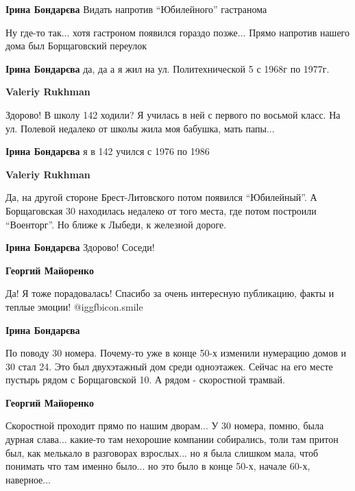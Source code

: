 \begin{itemize} %
\textbf{Ірина Бондарєва} Видать напротив \enquote{Юбилейного} гастранома

\begin{itemize} %
Ну где-то так... хотя гастроном появился гораздо позже...
Прямо напротив нашего дома был Борщаговский переулок

\textbf{Ірина Бондарєва} да, да а я жил на ул. Политехнической 5 с 1968г по 1977г.

\textbf{Valeriy Rukhman} 

Здорово! В школу 142 ходили? Я училась в ней с первого по восьмой класс. На
ул. Полевой недалеко от школы жила моя бабушка, мать папы...

\textbf{Ірина Бондарєва} я в 142 учился с 1976 по 1986

\textbf{Valeriy Rukhman} 

Да, на другой стороне Брест-Литовского потом появился \enquote{Юбилейный}. А
Борщаговская 30 находилась недалеко от того места, где потом построили
\enquote{Военторг}. Но ближе к Лыбеди, к железной дороге.

\end{itemize} %

\textbf{Ірина Бондарєва} Здорово! Соседи!

\begin{itemize} %
\textbf{Георгий Майоренко} 

Да! Я тоже порадовалась! Спасибо за очень интересную публикацию, факты и теплые эмоции! @igg{fbicon.smile} 

\textbf{Ірина Бондарєва} 

По поводу 30 номера. Почему-то уже в конце 50-х изменили нумерацию домов и 30
стал 24. Это был двухэтажный дом среди одноэтажек. Сейчас на его месте пустырь
рядом с Борщаговской 10. А рядом - скоростной трамвай.

\textbf{Георгий Майоренко} 

Скоростной проходит прямо по нашим дворам... У 30 номера, помню, была дурная
слава... какие-то там нехорошие компании собирались, толи там притон был, как
мелькало в разговорах взрослых... но я была слишком мала, чтоб понимать что там
именно было... но это было в конце 50-х, начале 60-х, наверное...



\end{itemize}
\end{itemize}
